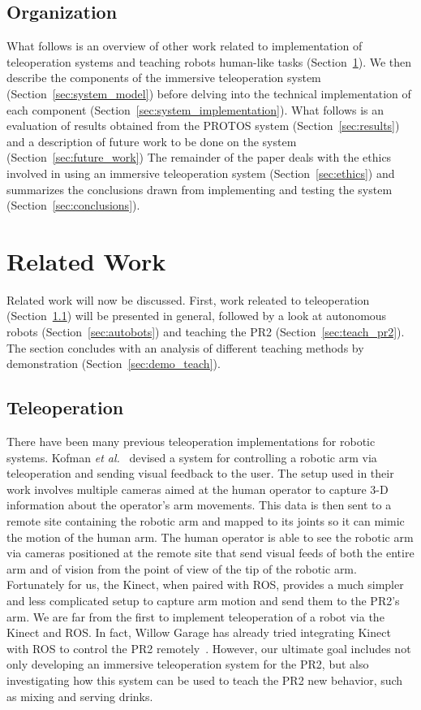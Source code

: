 \documentclass{sig-alternate}
\begin{document}
\subsection{Organization}
\indent What follows is an overview of other work related to implementation of 
teleoperation systems and teaching robots human-like tasks (Section~\ref{sec:related_work}). We then describe 
the components of the immersive teleoperation system (Section~\ref{sec:system_model}) before delving 
into the technical implementation of each component (Section~\ref{sec:system_implementation}). What follows is an 
evaluation of results obtained from the PROTOS system (Section~\ref{sec:results}) and a description of future work to be
done on the system (Section~\ref{sec:future_work}) The remainder of the paper deals with the ethics involved in using an immersive teleoperation
system (Section~\ref{sec:ethics}) and summarizes the conclusions drawn from implementing and testing the system (Section~\ref{sec:conclusions}).

\section{Related Work}
\label{sec:related_work}
\indent  Related work will now be discussed. First, work releated to teleoperation (Section~\ref{sec:teleop}) will be presented in general, followed by a look at
autonomous robots (Section~\ref{sec:autobots}) and teaching the PR2 (Section~\ref{sec:teach_pr2}). The section concludes with an analysis of different teaching methods by demonstration (Section~\ref{sec:demo_teach}).

\subsection{Teleoperation}
\label{sec:teleop}
\indent There have been many previous teleoperation implementations for robotic systems. Kofman \textit{et al.}~\cite{robot_interface} devised a system for controlling a robotic arm via teleoperation and sending visual feedback to the user. The setup used in their work involves multiple cameras aimed at the human operator to capture 3-D information about the operator's arm movements. This data is then sent to a remote site containing the robotic arm and mapped to its joints so it can mimic the motion of the human arm. The human operator is able to see the robotic arm via cameras positioned at the remote site that send visual feeds of both the entire arm and of vision from the point of view of the tip of the robotic arm. Fortunately for us, the Kinect, when paired with ROS, provides a much simpler and less complicated setup to capture arm motion and send them to the PR2's arm. We are far from the first to implement teleoperation of a robot via the Kinect and ROS. In fact, Willow Garage has already tried integrating Kinect with ROS to control the PR2 remotely~\cite{willow_kinect}. However, our ultimate goal includes not only developing an immersive teleoperation system for the PR2, but also investigating how this system can be used to teach the PR2 new behavior, such as mixing and serving drinks.
\end{document}
